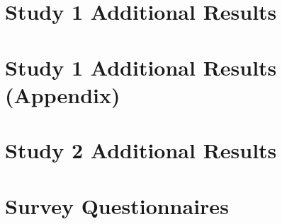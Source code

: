 \section{Study 1 Additional Results}
\label{sec:appendix_study1}









\clearpage
\section{Study 1 Additional Results (Appendix)}

















\clearpage

\section{Study 2 Additional Results}
\label{sec:appendix_study2}

















\clearpage

\section{Survey Questionnaires}

